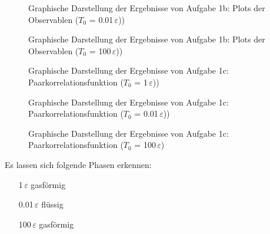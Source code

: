\begin{landscape}
	\begin{figure}
		\caption{Graphische Darstellung der Ergebnisse von Aufgabe 1b: Plots der Observablen ($T_0$ = 0.01$\,\varepsilon$))}
		\label{fig:observablen2}
	\end{figure}
\end{landscape} 

\begin{landscape}
	\begin{figure}
		\caption{Graphische Darstellung der Ergebnisse von Aufgabe 1b: Plots der Observablen ($T_0$ = 100$\,\varepsilon$))}
		\label{fig:observablen3}
	\end{figure}
\end{landscape} 


\begin{landscape}
	\begin{figure}
		\caption{Graphische Darstellung der Ergebnisse von Aufgabe 1c: Paarkorrelationsfunktion ($T_0$ = 1$\,\varepsilon$))}
		\label{fig:paarb1}
	\end{figure}
\end{landscape} 

\begin{landscape}
	\begin{figure}
		\caption{Graphische Darstellung der Ergebnisse von Aufgabe 1c: Paarkorrelationsfunktion ($T_0$ = 0.01$\,\varepsilon$))}
		\label{fig:paarb2}
	\end{figure}
\end{landscape} 


\begin{landscape}
	\begin{figure}
		\caption{Graphische Darstellung der Ergebnisse von Aufgabe 1c: Paarkorrelationsfunktion ($T_0$ = 100$\,\varepsilon$)}
		\label{fig:paarb3}
	\end{figure}
\end{landscape} 

Es lassen sich folgende Phasen erkennen:
\begin{enumerate}
\item[1$\,\varepsilon$] gasförmig \\
\item[0.01$\,\varepsilon$] flüssig \\
\item[100$\,\varepsilon$] gasförmig\\
\end{enumerate}

